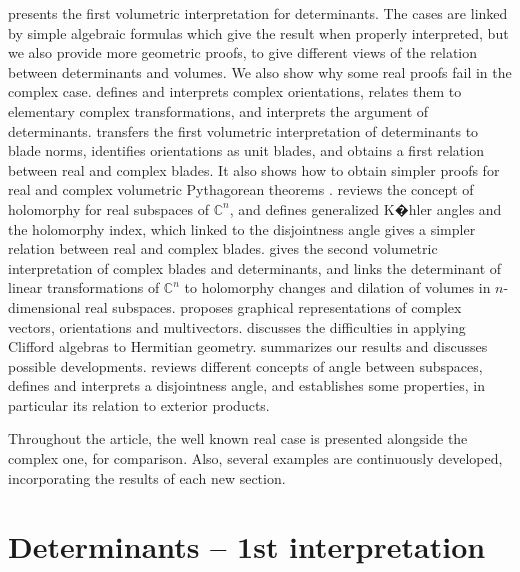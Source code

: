 \documentclass{birkjour}
\theoremstyle{definition}
\def\C			{\mathds{C}}
\begin{document}
 presents the first volumetric interpretation for determinants.
The cases are linked by simple algebraic formulas which give the result when properly interpreted, 
but we also provide more geometric proofs, to give different views of the relation between determinants and volumes.
We also show why some real proofs fail in the complex case.
%
 defines and interprets complex orientations, relates them to elementary complex transformations, and interprets the argument of determinants. 
%
 transfers the first volumetric interpretation of determinants to blade norms, identifies orientations as unit blades, and obtains a first relation between real and complex blades.
It also shows how to obtain simpler proofs for real and complex volumetric Pythagorean theorems \cite{Mandolesi_Pythagorean}.
%
 reviews the concept of holomorphy for real subspaces of $\C^n$, and defines generalized K�hler angles and the holomorphy index, which linked to the disjointness angle gives a simpler relation between real and complex blades.
%
 gives the second volumetric interpretation of complex blades and determinants, 
and links the determinant of linear transformations of $\C^n$ to  holomorphy changes and dilation of volumes in $n$-dimensional real subspaces.
%
 proposes graphical representations of complex vectors, orientations and multivectors.
%
 discusses the difficulties in applying Clifford algebras to Hermitian geometry. 
%
 summarizes our results and discusses possible developments.
%
 reviews different concepts of angle between subspaces, defines and interprets a disjointness angle, and establishes some properties, in particular its relation to exterior products.

Throughout the article, the well known real case is presented alongside the complex one, for comparison.
Also, several examples are continuously developed, incorporating the results of each new section.


\section{Determinants -- 1st interpretation}\label{sc:Determinants}
\end{document}
